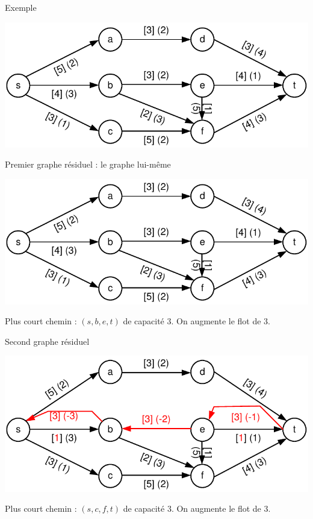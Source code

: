 
\begin{frame}{Exemple}
    \begin{center}
        \includegraphics[width=.8\textwidth]{fig/fmcm1.pdf}
    \end{center}
\end{frame}

\begin{frame}{Premier graphe résiduel : le graphe lui-même}
    \begin{center}
        \includegraphics[width=.8\textwidth]{fig/fmcm1.pdf}
    \end{center}

    Plus court chemin : $(s,b,e,t)$ de capacité 3. On augmente le flot de 3.
\end{frame}

\begin{frame}{Second graphe résiduel}
    \begin{center}
        \includegraphics[width=.8\textwidth]{fig/fmcm2.pdf}
    \end{center}

    Plus court chemin : $(s,c,f,t)$ de capacité 3. On augmente le flot de 3.
\end{frame}

